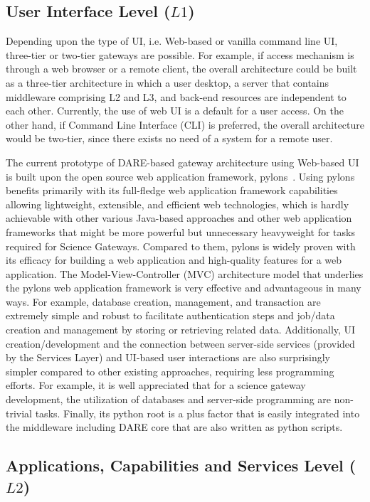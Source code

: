 \documentclass[]{svjour3}
\begin{document}
\subsection{User Interface Level ($L1$)}
 Depending upon the
type of UI, i.e. Web-based or vanilla command line UI, three-tier or
two-tier gateways are possible. For example, if access mechanism is
through a web browser or a remote client, the overall architecture
could be built as a three-tier architecture in which a user desktop, a
server that contains middleware comprising L2 and L3, and back-end
resources are independent to each other. Currently, the use of web UI
is a default for a user access. On the other hand, if Command Line
Interface (CLI) is preferred, the overall architecture would be
two-tier, since there exists no need of a system for a remote user.
 
The current prototype of DARE-based gateway architecture using
Web-based UI is built upon the open source web application framework,
pylons~\cite{bigjob_cloudcom10}. Using pylons benefits primarily with its
full-fledge web application framework capabilities allowing
lightweight, extensible, and efficient web technologies, which is
hardly achievable with other various Java-based approaches and other
web application frameworks that might be more powerful but unnecessary
heavyweight for tasks required for Science Gateways. Compared to them,
pylons is widely proven with its efficacy for building a web
application and high-quality features for a web application.  The
Model-View-Controller (MVC) architecture model that underlies the
pylons web application framework \cite{bigjob_cloudcom10} is very effective
and advantageous in many ways. For example, database creation,
management, and transaction are extremely simple and robust to
facilitate authentication steps and job/data creation and management
by storing or retrieving related data. Additionally, UI
creation/development and the connection between server-side services
(provided by the Services Layer) and UI-based user interactions are
also surprisingly simpler compared to other existing approaches,
requiring less programming efforts. For example, it is well
appreciated that for a science gateway development, the utilization of
databases and server-side programming are non-trivial tasks. Finally,
its python root is a plus factor that is easily integrated into the
middleware including DARE core that are also written as python
scripts.


\subsection{Applications, Capabilities and Services Level ($L2$)}
\end{document}
